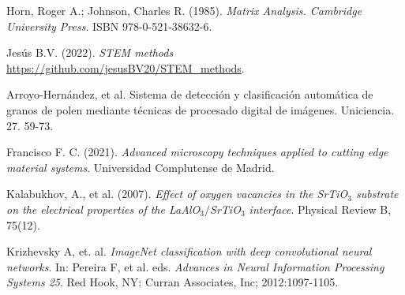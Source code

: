 \begin{thebibliography}{9}
Horn, Roger A.; Johnson, Charles R. (1985). \textit{Matrix Analysis. Cambridge University Press}. ISBN 978-0-521-38632-6.

Jesús B.V. (2022). \textit{STEM methods} \url{https://github.com/jesusBV20/STEM_methods}.

Arroyo-Hernández, et al. Sistema de detección y clasificación automática de granos de polen mediante técnicas de procesado digital de imágenes. Uniciencia. 27. 59-73. 

Francisco F. C. (2021). \textit{Advanced microscopy techniques applied to cutting edge material systems}. Universidad Complutense de Madrid.

Kalabukhov, A., et al. (2007). \textit{Effect of oxygen vacancies in the SrTiO$_3$ substrate on the electrical properties of the LaAlO$_3/$SrTiO$_3$ interface}. Physical Review B, 75(12).

Krizhevsky A, et. al. \textit{ImageNet classification
with deep convolutional neural networks}. In: Pereira F, et al. eds. \textit{Advances in Neural
Information Processing Systems 25}. Red Hook, NY: Curran
Associates, Inc; 2012:1097-1105.
\end{thebibliography}


